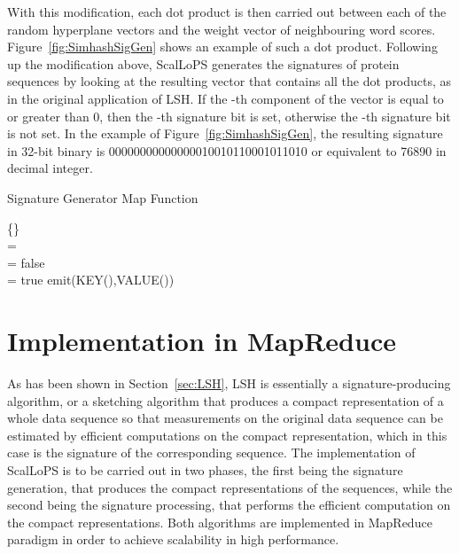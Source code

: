 \documentclass[titlepage]{csetr}
\begin{document}
With this modification, each dot product is then carried out between each of the random hyperplane vectors and the weight vector of neighbouring word scores. Figure~\ref{fig:SimhashSigGen} shows an example of such a dot product. Following up the modification above, ScalLoPS generates the signatures of protein sequences by looking at the resulting vector that contains all the dot products, as in the original application of LSH. If the -th component of the vector is equal to or greater than 0, then the -th signature bit is set, otherwise the -th signature bit is not set. In the example of Figure~\ref{fig:SimhashSigGen}, the resulting signature in 32-bit binary is 00000000000000010010110001011010 or equivalent to 76890 in decimal integer.



\begin{algorithm} [t]
 	\caption{Signature Generator Map Function}
	\label{alg:SimhashSigGen}
	\SetAlgoLined
	 \{\}\\
	[0 ... 31] = \\
	[0 ... 31] = false\\
	\For{} {
		\If{} {
			 = true
		}
	}
	emit(KEY(),VALUE())
\end{algorithm}

\section{Implementation in MapReduce}
\label{sec:MapReduce}


As has been shown in Section~\ref{sec:LSH}, LSH is essentially a signature-producing algorithm, or a sketching algorithm that produces a compact representation of a whole data sequence so that measurements on the original data sequence can be estimated by efficient computations on the compact representation, which in this case is the signature of the corresponding sequence. The implementation of ScalLoPS is to be carried out in two phases, the first being the signature generation, that produces the compact representations of the sequences, while the second being the signature processing, that performs the efficient computation on the compact representations. Both algorithms are implemented in MapReduce paradigm in order to achieve scalability in high performance.
\end{document}
